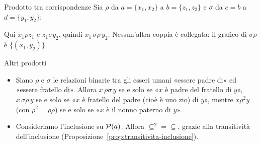 \begin{esempio}{Prodotto tra corrispondenze}
    Sia $\rho$ da $a = \{x_1, x_2\}$ a $b = \{z_1, z_2\}$ e $\sigma$ da $c = b$ a $d = \{y_1, y_2\}$:
    \begin{center}
    \end{center}
    Qui $x_1 \rho z_1$ e $z_1 \sigma y_2$, quindi $x_1 \,\sigma\rho\, y_2$. Nessun'altra coppia è collegata:
    il grafico di $\sigma\rho$ è $\{(x_1, y_2)\}$.
\end{esempio}

\begin{esempio}{Altri prodotti}
    \begin{itemize}
        \item Siano $\rho$ e $\sigma$ le relazioni binarie tra gli esseri umani «essere padre di» ed «essere fratello di».
              Allora $x \,\rho\sigma\, y$ se e solo se «$x$ è padre del fratello di $y$», $x \,\sigma\rho\, y$ se e solo se
              «$x$ è fratello del padre (cioè è uno zio) di $y$», mentre $x \rho^2 y$ (con $\rho^2 = \rho\rho$) se e solo se
              «$x$ è il nonno paterno di $y$».
        \item Consideriamo l'inclusione su $\mathcal{P}(a)$. Allora $\subseteq^2 = \subseteq$, grazie alla transitività dell'inclusione
              (Proposizione~\ref{prop:transitivita-inclusione}).
    \end{itemize}
\end{esempio}

